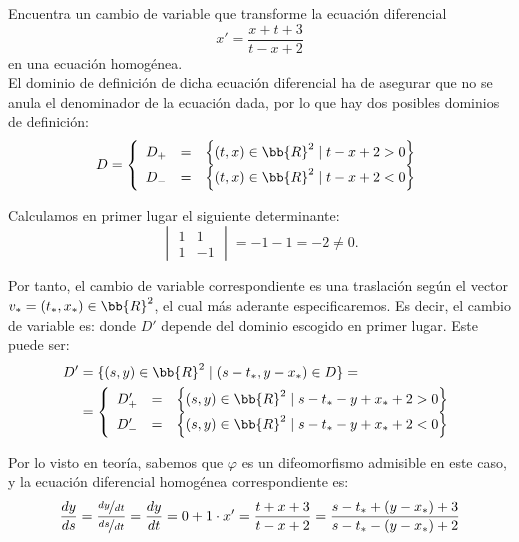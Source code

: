 \documentclass[12pt]{article}
\begin{document}
\begin{ejercicio}
    Encuentra un cambio de variable que transforme la ecuación diferencial
    \[
        x' = \dfrac{x + t + 3}{t - x + 2}
    \]
    en una ecuación homogénea.\\

    El dominio de definición de dicha ecuación diferencial ha de asegurar que no se anula el denominador de la ecuación dada, por lo que hay dos posibles dominios de definición:
    \begin{equation*}
        D = \left\{
            \begin{array}{rcl}
                D_+ & = & \left\{(t,x)\in \bb{R}^2 \mid t-x+2>0\right\}\\
                D_- & = & \left\{(t,x)\in \bb{R}^2 \mid t-x+2<0\right\}
            \end{array}
        \right.
    \end{equation*}

    Calculamos en primer lugar el siguiente determinante:
    \begin{equation*}
        \begin{vmatrix}
            1 & 1\\
            1& -1
        \end{vmatrix} = -1-1 = -2 \neq 0.
    \end{equation*}

    Por tanto, el cambio de variable correspondiente es una traslación según el vector $v_\ast = (t_\ast, x_\ast)\in \bb{R}^2$, el cual más aderante especificaremos. Es decir, el cambio de variable es:
    donde $D'$ depende del dominio escogido en primer lugar.
    Este puede ser:
    \begin{align*}
        D' &= \{ (s,y)\in \bb{R}^2 \mid \left(s-t_\ast,y-x_\ast\right)\in D\}
        =\\&= \left\{
            \begin{array}{rcl}
                D_+' & = & \left\{(s,y)\in \bb{R}^2 \mid s-t_\ast-y+x_\ast+2>0\right\}\\
                D_-' & = & \left\{(s,y)\in \bb{R}^2 \mid s-t_\ast-y+x_\ast+2<0\right\}
            \end{array}
        \right.
    \end{align*}

    Por lo visto en teoría, sabemos que $\varphi$ es un difeomorfismo admisible en este caso, y la ecuación diferencial homogénea correspondiente es:
    \begin{equation*}
        \dfrac{dy}{ds} = \dfrac{\nicefrac{dy}{dt}}{\nicefrac{ds}{dt}} = \frac{dy}{dt} = 0+1\cdot x' = \dfrac{t+x+3}{t-x+2}
        = \dfrac{s-t_\ast+(y-x_\ast)+3}{s-t_\ast-(y-x_\ast)+2}
    \end{equation*}


\end{ejercicio}
\end{document}
